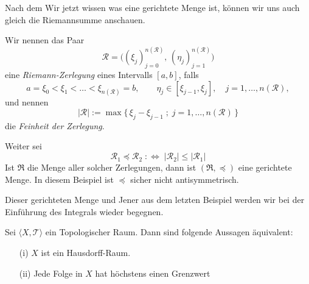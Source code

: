 Nach dem Wir jetzt wissen was eine gerichtete Menge ist, 
können wir uns auch gleich die Riemannsumme anschauen.

{
    Wir nennen das Paar 
$$
\mathcal{R} = \bigl((\xi_j)_{j=0}^{n(\mathcal{R})}, \, (\eta_j)_{j=1}^{n(\mathcal{R})}\bigr)
$$
eine \emph{Riemann-Zerlegung} eines Intervalls $[a,b]$, falls
$$
a = \xi_0 < \xi_1 < \dots < \xi_{n(\mathcal{R})} = b, 
\qquad \eta_j \in [\xi_{j-1}, \xi_j], \quad j=1,\dots,n(\mathcal{R}),
$$
und nennen
$$
|\mathcal{R}| := \max \{\, \xi_j - \xi_{j-1} \; ; \; j=1,\dots,n(\mathcal{R}) \,\}
$$
die \emph{Feinheit der Zerlegung}.

Weiter sei 
$$
\mathcal{R}_1 \preceq \mathcal{R}_2 \;:\Longleftrightarrow\; |\mathcal{R}_2| \leq |\mathcal{R}_1|
$$
Ist $\Re$ die Menge aller solcher Zerlegungen, dann ist $(\Re,\preceq)$ eine gerichtete Menge.
In diesem Beispiel ist $\preceq$ sicher nicht antisymmetrisch.

\medskip

Dieser gerichteten Menge und Jener aus dem letzten Beispiel werden wir bei der Einführung 
des Integrals wieder begegnen.
}

\mprop{}
{
    Sei $\langle X, \mathcal{T} \rangle$ ein Topologischer Raum.
    Dann sind folgende Aussagen äquivalent:
\begin{itemize}
    \item[(i)] $X$ ist ein Hausdorff-Raum.
    \item[(ii)] Jede Folge in $X$ hat höchstens einen Grenzwert
\end{itemize}
}

